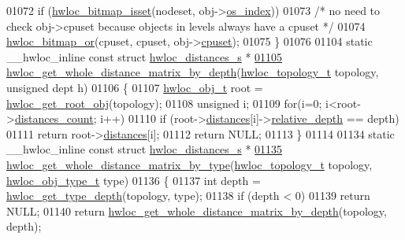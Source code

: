\begin{DoxyCode}
01072                 \textcolor{keywordflow}{if} (\hyperlink{a00065_ga2583f44cbdb5fff2ea40efdcf3975d3f}{hwloc_bitmap_isset}(nodeset, obj->\hyperlink{a00016_a61a7a80a68eaccbaaa28269e678c81a9}{os_index}))
01073                         \textcolor{comment}{/* no need to check obj->cpuset because objects in levels
       always have a cpuset */}
01074                         \hyperlink{a00065_ga1ba1de709ee9a7cf5cc8ad2d9a1a81d4}{hwloc_bitmap_or}(cpuset, cpuset, obj->\hyperlink{a00016_a67925e0f2c47f50408fbdb9bddd0790f}{cpuset});
01075 \}
01076 
01104 \textcolor{keyword}{static} \_\_hwloc\_inline \textcolor{keyword}{const} \textcolor{keyword}{struct }\hyperlink{a00014}{hwloc_distances_s} *
\hypertarget{a00031_source_l01105}{}\hyperlink{a00063_ga48dfec8b8ba1fb8f2073ecd0728f0ca6}{01105} \hyperlink{a00063_ga48dfec8b8ba1fb8f2073ecd0728f0ca6}{hwloc_get_whole_distance_matrix_by_depth}(\hyperlink{a00039_ga9d1e76ee15a7dee158b786c30b6a6e38}{hwloc_topology_t} topology, \textcolor{keywordtype}{unsigned} dept
      h)
01106 \{
01107   \hyperlink{a00016}{hwloc_obj_t} root = \hyperlink{a00053_gadbf58f6e187efbdb3cd9a8e30311b7d7}{hwloc_get_root_obj}(topology);
01108   \textcolor{keywordtype}{unsigned} i;
01109   \textcolor{keywordflow}{for}(i=0; i<root->\hyperlink{a00016_a8be6f63eca4da91000c832280db927b7}{distances_count}; i++)
01110     \textcolor{keywordflow}{if} (root->\hyperlink{a00016_a9a5dd75596edc48fe834f81988cdc0d6}{distances}[i]->\hyperlink{a00014_a6fe066eaf62ee448aa05bab8e7217ff7}{relative_depth} == depth)
01111       \textcolor{keywordflow}{return} root->\hyperlink{a00016_a9a5dd75596edc48fe834f81988cdc0d6}{distances}[i];
01112   \textcolor{keywordflow}{return} NULL;
01113 \}
01114 
01134 \textcolor{keyword}{static} \_\_hwloc\_inline \textcolor{keyword}{const} \textcolor{keyword}{struct }\hyperlink{a00014}{hwloc_distances_s} *
\hypertarget{a00031_source_l01135}{}\hyperlink{a00063_ga9979237728f7a00a38836e15a8e8cd17}{01135} \hyperlink{a00063_ga9979237728f7a00a38836e15a8e8cd17}{hwloc_get_whole_distance_matrix_by_type}(\hyperlink{a00039_ga9d1e76ee15a7dee158b786c30b6a6e38}{hwloc_topology_t} topology, 
      \hyperlink{a00041_gacd37bb612667dc437d66bfb175a8dc55}{hwloc_obj_type_t} type)
01136 \{
01137   \textcolor{keywordtype}{int} depth = \hyperlink{a00046_gaea7c64dd59467f5201ba87712710b14d}{hwloc_get_type_depth}(topology, type);
01138   \textcolor{keywordflow}{if} (depth < 0)
01139     \textcolor{keywordflow}{return} NULL;
01140   \textcolor{keywordflow}{return} \hyperlink{a00063_ga48dfec8b8ba1fb8f2073ecd0728f0ca6}{hwloc_get_whole_distance_matrix_by_depth}(topology, depth);

\end{DoxyCode}
